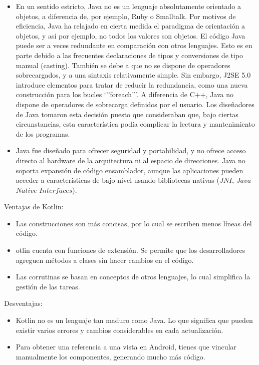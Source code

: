 \begin{itemize}
\item En un sentido estricto, Java no es un lenguaje absolutamente orientado a objetos, a diferencia de, por ejemplo, Ruby o Smalltalk. Por motivos de eficiencia, Java ha relajado en cierta medida el paradigma de orientación a objetos, y así por ejemplo, no todos los valores son objetos.
El código Java puede ser a veces redundante en comparación con otros lenguajes. Esto es en parte debido a las frecuentes declaraciones de tipos y conversiones de tipo manual (casting). También se debe a que no se dispone de operadores sobrecargados, y a una sintaxis relativamente simple. Sin embargo, J2SE 5.0 introduce elementos para tratar de reducir la redundancia, como una nueva construcción para los bucles ‘’’foreach’’’.
A diferencia de C++, Java no dispone de operadores de sobrecarga definidos por el usuario. Los diseñadores de Java tomaron esta decisión puesto que consideraban que, bajo ciertas circunstancias, esta característica podía complicar la lectura y mantenimiento de los programas.

\item Java fue diseñado para ofrecer seguridad y portabilidad, y no ofrece acceso directo al hardware de la arquitectura ni al espacio de direcciones. Java no soporta expansión de código ensamblador, aunque las aplicaciones pueden acceder a características de bajo nivel usando bibliotecas nativas ($JNI$, $Java$ $Native$ $Interfaces$).

\end{itemize}

Ventajas de Kotlin:

\begin{itemize}
\item Las construcciones son más concisas, por lo cual se escriben menos líneas del código.
\item otlin cuenta con funciones de extensión. Se permite que los desarrolladores agreguen métodos a clases sin hacer cambios en el código.
\item Las corrutinas se basan en conceptos de otros lenguajes, lo cual simplifica la gestión de las tareas.
\end{itemize}

Desventajas:

\begin{itemize}
\item Kotlin no es un lenguaje tan maduro como Java. Lo que significa que pueden existir varios errores y cambios considerables en cada actualización.
\item Para obtener una referencia a una vista en Android, tienes que vincular manualmente los componentes, generando mucho más código.
\end{itemize}


